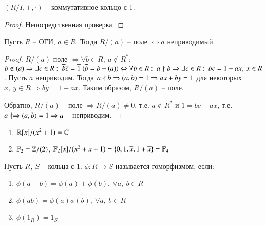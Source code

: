 \documentclass[main]{subfiles}
\begin{document}
\begin{proposition}
    $(R/I, +, \cdot)$ -- коммутативное кольцо с 1.
\end{proposition}

\begin{proof}
    Непосредственная проверка.
\end{proof}

\begin{theorem}
    Пусть $R$ -- ОГИ, $a \in R$. Тогда $R/(a)$ -- поле 
    $\Leftrightarrow a$ неприводимый.
\end{theorem}

\begin{proof}
    $R/(a)$ поле $\Leftrightarrow \forall b \in R, \ a \not\in R^*$: $b \not\in (a) \Rightarrow
    \exists c \in R: \ \overline{b}\overline{c} = \overline{1} \ (\overline{b} = b + (a)) \Leftrightarrow
    \forall b \in R: \ a \not\mid b \Rightarrow \exists c \in R: \ bc = 1 + ax, \ x \in R$. Пусть $a$ неприводим. Тогда 
    $a \not\mid b \Rightarrow (a, b) = 1 \Rightarrow ax + by = 1$ для некоторых $x, \ y \in R \Rightarrow by = 1 - ax$.
    Таким образом, $R/(a)$ -- поле. 

    Обратно,  $R/(a)$ -- поле $\Rightarrow R/(a) \neq 0$, т.е. $a \not\in R^*$ и $1 = bc - ax$, т.е. 
    $a \not\mid \Rightarrow (a, b) = 1 \Rightarrow a$ -- неприводим.
\end{proof}

\begin{example}
    \begin{enumerate}
        \item $\mathbb{R}[x]/(x^2+1) = \mathbb{C}$
        \item $\mathbb{F}_2 = \mathbb{Z}/(2)$, $\mathbb{F}_2[x]/(x^2+x+1) = \{0, 1, \overline{x}, 1 + \overline{x}\}  = \mathbb{F}_4$
    \end{enumerate}
\end{example}

\begin{definition} [Гомоморфизм]
    Пусть $R, \ S$ -- кольца с 1. $\phi: R \rightarrow S$ называется гоморфизмом, если: 
    \begin{enumerate}
        \item $\phi(a+b) = \phi(a) + \phi(b), \ \forall a, \ b \in R$
        \item $\phi(ab) = \phi(a)\phi(b), \ \forall a, \ b \in R$
        \item $\phi(1_R) = 1_S$
    \end{enumerate}
\end{definition}
\end{document}
